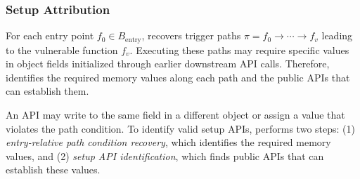 
\subsubsection{Setup Attribution}
For each entry point $f_0 \in B_{\mathrm{entry}}$, \sys recovers trigger paths $\pi=f_0\rightarrow\cdots\rightarrow f_v$ leading to the vulnerable function $f_v$. 
%
Executing these paths may require specific values in object fields initialized through earlier downstream API calls. Therefore, \sys identifies the required memory values along each path and the public APIs that can establish them.

An API may write to the same field in a different object or assign a value that violates the path condition.
To identify valid setup APIs, \sys performs two steps: (1) \textit{entry-relative path condition recovery}, which identifies the required memory values, and (2) \textit{setup API identification}, which finds public APIs that can establish these values.





